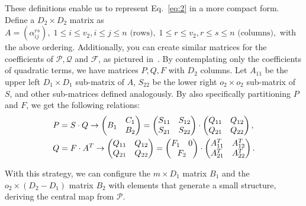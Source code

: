 \documentclass[a4paper, 14pt]{extarticle}
\begin{document}
These definitions enable us to represent Eq.~\ref{eq:2} in a more compact form. Define a $D_{2} \times D_{2}$ matrix as
$
    A = (\alpha_{ij}^{rs}),\; 1 \leq i \leq v_{2}, i \leq j \leq n \text{ (rows)},\; 1 \leq r \leq v_{2}, r \leq s \leq n \text{ (columns)},
$
with the above ordering. Additionally, you can create similar matrices for the coefficients of $\mathcal{P}, \mathcal{Q}$ and $\mathcal{F}$, as pictured in~\cite[Figure 7.5]{Petzoldt:phd:2013:jul}. By contemplating only the coefficients of quadratic terms, we have matrices $P, Q, F$ with $D_{2}$ columns. Let $A_{11}$ be the upper left $D_{1} \times D_{1}$ sub-matrix of $A$, $S_{22}$ be the lower right $o_{2} \times o_{2}$ sub-matrix of $S$, and other sub-matrices defined analogously. By also specifically partitioning $P$ and $F$, we get the following relations:
\begin{align}\label{eq:3}
    P &= S \cdot Q \rightarrow
    \begin{pmatrix}
        B_{1} & \begin{matrix} C_{1} \\ B_{2} \end{matrix} \\
    \end{pmatrix} =
    \begin{pmatrix}
        S_{11} & S_{12} \\
        S_{21} & S_{22}
    \end{pmatrix} \cdot
    \begin{pmatrix}
        Q_{11} & Q_{12} \\
        Q_{21} & Q_{22}
    \end{pmatrix}, \\
    \label{eq:4}
    Q &= F \cdot A^{T} \rightarrow
    \begin{pmatrix}
        Q_{11} & Q_{12} \\
        Q_{21} & Q_{22}
    \end{pmatrix} =
    \begin{pmatrix}
        F_{1} & 0 \\
        \multicolumn{2}{c}{F_{2}}
    \end{pmatrix} \cdot
    \begin{pmatrix}
        A_{11}^{T} & A_{12}^{T} \\
        A_{21}^{T} & A_{22}^{T}
    \end{pmatrix}.
\end{align}

With this strategy, we can configure the $m \times D_{1}$ matrix $B_{1}$ and the $o_{2} \times (D_{2} - D_{1})$ matrix $B_{2}$ with elements that generate a small structure, deriving the central map from $\mathcal{P}$.
\end{document}
